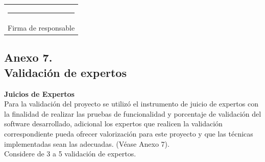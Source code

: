 \documentclass[12pt, a4paper, nofontenc, numbers=endperiod]{apa7}
\begin{document}
{{\begin{turn}{90}
{\begin{tabular}{|p{5cm}|r|r|r|r|}
				
				\multicolumn{5}{c}{ \rule[0mm]{45mm}{0.1mm}}\\
				
				\multicolumn{5}{c}{ Firma de responsable} \\
				
				
			\end{tabular}
			
			
		}
		
	\end{turn}
}


\newpage
\subsection*{\normalsize \centering Anexo 7. \\ Validación de expertos} 
\justify
\textbf{Juicios de Expertos}\\
Para la validación del proyecto se utilizó el instrumento de juicio de expertos con la finalidad de realizar las pruebas de funcionalidad y porcentaje de validación del software desarrollado, adicional los expertos que realicen la validación correspondiente pueda ofrecer valorización para este proyecto y que las técnicas implementadas sean las adecuadas. (Véase Anexo 7).\\
Considere de 3 a 5 validación de expertos.

\newpage
\begin{turn}{90}
	

\end{turn}}
\end{document}
